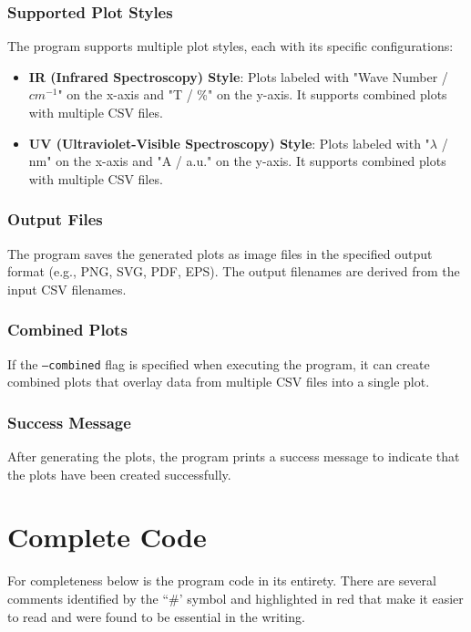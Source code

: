 \documentclass[../Master.tex]{subfiles}
\begin{document}
\subsubsection{Supported Plot Styles}

The program supports multiple plot styles, each with its specific configurations:

\begin{itemize}
	\item \textbf{IR (Infrared Spectroscopy) Style}: Plots labeled with "Wave Number / $cm^{-1}$" on the x-axis and "T / \%" on the y-axis. It supports combined plots with multiple CSV files.

	\item \textbf{UV (Ultraviolet-Visible Spectroscopy) Style}: Plots labeled with "$\lambda$ / nm" on the x-axis and "A / a.u." on the y-axis. It supports combined plots with multiple CSV files.
\end{itemize}

\subsubsection{Output Files}

The program saves the generated plots as image files in the specified output format (e.g., PNG, SVG, PDF, EPS). The output filenames are derived from the input CSV filenames.

\subsubsection{Combined Plots}

If the \texttt{--combined} flag is specified when executing the program, it can create combined plots that overlay data from multiple CSV files into a single plot.

\subsubsection{Success Message}

After generating the plots, the program prints a success message to indicate that the plots have been created successfully.

\newpage
\section{Complete Code}\label{sec:code}

For completeness below is the program code in its entirety. There are several comments identified by the ``\#' symbol and highlighted in red that make it easier to read and were found to be essential in the writing.
\newline


\end{document}
